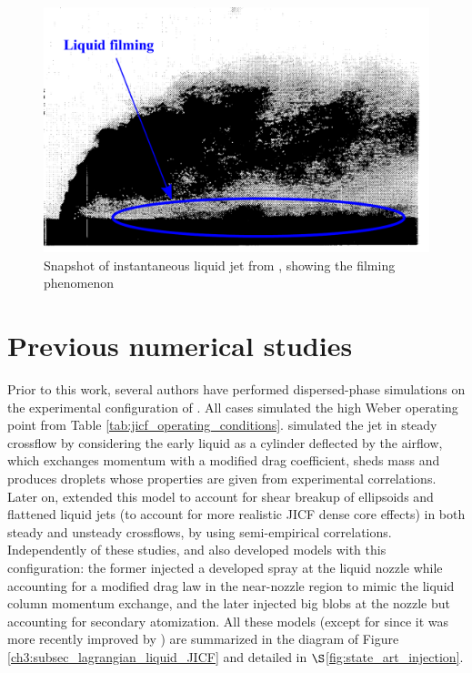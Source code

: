 \begin{figure}[h!]	
	\centering	
	\includegraphics[scale=0.4]{./part2_developments/figures_ch6_lagrangian_JICF/expe_results/snapshot_expe_filming}
	\caption{Snapshot of instantaneous liquid jet from , showing the filming phenomenon}
	\label{fig:jicf_snapshot_expe_filming}
\end{figure}



%

\section{Previous numerical studies}
\label{ch6:previous_numerical_studies}

Prior to this work, several authors have performed dispersed-phase simulations on the experimental configuration of . All cases simulated the high Weber operating point from Table \ref{tab:jicf_operating_conditions}.  simulated the jet in steady crossflow by considering the early liquid as a cylinder deflected by the airflow, which exchanges momentum with a modified drag coefficient, sheds mass and produces droplets whose properties are given from experimental correlations. Later on,  extended this model to account for shear breakup of ellipsoids and flattened liquid jets (to account for more realistic JICF dense core effects) in both steady and unsteady crossflows, by using semi-empirical correlations. Independently of these studies,  and  also developed models with this configuration: the former injected a developed spray at the liquid nozzle while accounting for a modified drag law in the near-nozzle region to mimic the liquid column momentum exchange, and the later injected big blobs at the nozzle but accounting for secondary atomization. All these models (except for
 since it was more recently improved by ) are summarized in the diagram of Figure \ref{ch3:subsec_lagrangian_liquid_JICF} and detailed in $\S$\ref{fig:state_art_injection}.


